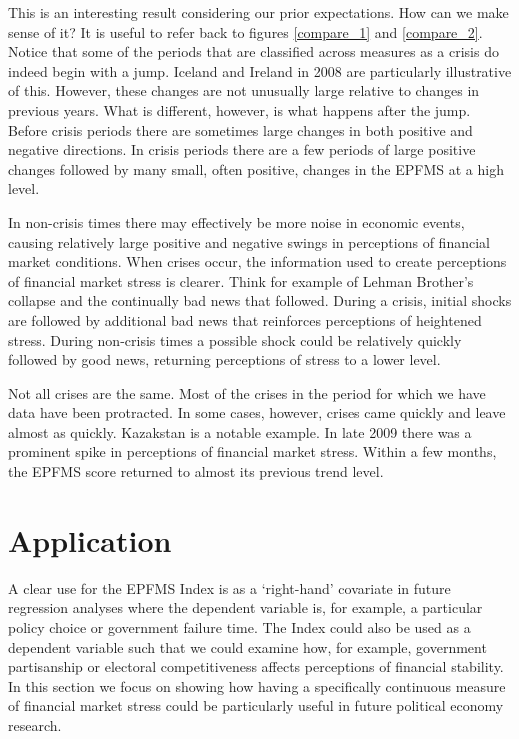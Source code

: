 \documentclass[]{article}
\begin{document}
This is an interesting result considering our prior expectations. How can we make sense of it? It is useful to refer back to figures \ref{compare_1} and \ref{compare_2}. Notice that some of the periods that are classified across measures as a crisis do indeed begin with a jump. Iceland and Ireland in 2008 are particularly illustrative of this. However, these changes are not unusually large relative to changes in previous years. What is different, however, is what happens after the jump. Before crisis periods there are sometimes large changes in both positive and negative directions. In crisis periods there are a few periods of large positive changes followed by many small, often positive, changes in the EPFMS at a high level.

In non-crisis times there may effectively be more noise in economic events, causing relatively large positive and negative swings in perceptions of financial market conditions. When crises occur, the information used to create perceptions of financial market stress is clearer. Think for example of Lehman Brother's collapse and the continually bad news that followed. During a crisis, initial shocks are followed by additional bad news that reinforces perceptions of heightened stress. During non-crisis times a possible shock could be relatively quickly followed by good news, returning perceptions of stress to a lower level.

Not all crises are the same. Most of the crises in the period for which we have data have been protracted. In some cases, however, crises came quickly and leave almost as quickly. Kazakstan is a notable example. In late 2009 there was a prominent spike in perceptions of financial market stress. Within a few months, the EPFMS score returned to almost its previous trend level.

\section{Application}\label{application}

A clear use for the EPFMS Index is as a `right-hand' covariate in future regression analyses where the dependent variable is, for example, a particular policy choice or government failure time. The Index could also be used as a dependent variable such that we could examine how, for example, government partisanship or electoral competitiveness affects perceptions of financial stability. In this section we focus on showing how having a specifically continuous measure of financial market stress could be particularly useful in future political economy research.
\end{document}
